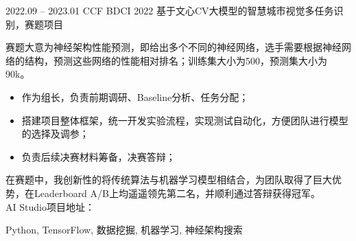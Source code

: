 %
%


 
\begin{experiences}
  \experiencenew
  {2022.09 -- 2023.01} {CCF BDCI 2022 基于文心CV大模型的智慧城市视觉多任务识别，赛题项目}
  {
    赛题大意为神经架构性能预测，即给出多个不同的神经网络，选手需要根据神经网络的结构，预测这些网络的性能相对排名；训练集大小为500，预测集大小为90k。
    \begin{itemize}
      \item  作为组长，负责前期调研、Baseline分析、任务分配；
      \item  搭建项目整体框架，统一开发实验流程，实现测试自动化，方便团队进行模型的选择及调参；
      \item  负责后续决赛材料筹备，决赛答辩；
    \end{itemize}
    在赛题中，我创新性的将传统算法与机器学习模型相结合，为团队取得了巨大优势，在Leaderboard A/B上均遥遥领先第二名，并顺利通过答辩获得冠军。 \\
    AI Studio项目地址：
                }
                {Python, TensorFlow, 数据挖掘, 机器学习, 神经架构搜索}
                

\end{experiences}
